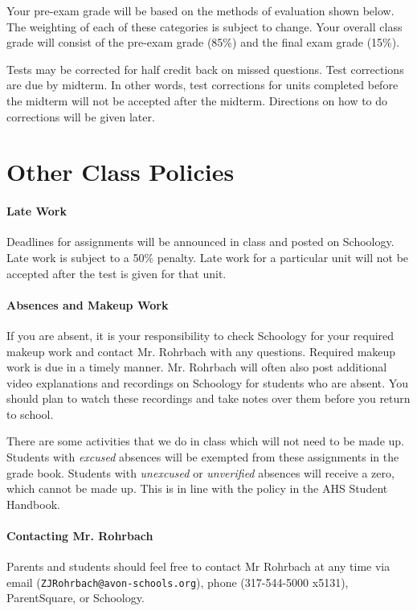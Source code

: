 \documentclass[10pt]{exam}
\begin{document}
Your pre-exam grade will be based on the methods of 
evaluation shown below. The weighting of each of these 
categories is subject to change. Your overall class 
grade will consist of the pre-exam grade (85\%) and the
final exam grade (15\%).

\begin{center}
\end{center}

Tests may be corrected for half credit back on missed 
questions.  Test corrections are due by midterm.  In other 
words, test corrections for units completed before the 
midterm will not be accepted after the midterm.  Directions 
on how to do corrections will be given later.



\section*{Other Class Policies}

\paragraph{Late Work}
	Deadlines for assignments will be announced in class and posted on Schoology.  Late work is subject to a 50\% penalty.  Late work for a particular unit will not be accepted after the test is given for that unit.

\paragraph{Absences and Makeup Work}
	If you are absent, it is your responsibility to check Schoology for your required makeup work and contact Mr. Rohrbach with any questions.  Required makeup work is due in a timely manner.  	Mr. Rohrbach will often also post additional video explanations and recordings on Schoology for students who are absent. You should plan to watch these recordings and take notes over them before you return to school.

	There are some activities that we do in class which will not need to be made up.  Students with \emph{excused} absences will be exempted from these assignments in the grade book.  Students with \emph{unexcused} or \emph{unverified} absences will receive a zero, which cannot be made up.  This is in line with the policy in the AHS Student Handbook.

\paragraph{Contacting Mr. Rohrbach}
	Parents and students should feel free to contact Mr Rohrbach at any time via email (\texttt{ZJRohrbach@avon-schools.org}), phone (317-544-5000 x5131), \mbox{ParentSquare}, or Schoology.
\end{document}
